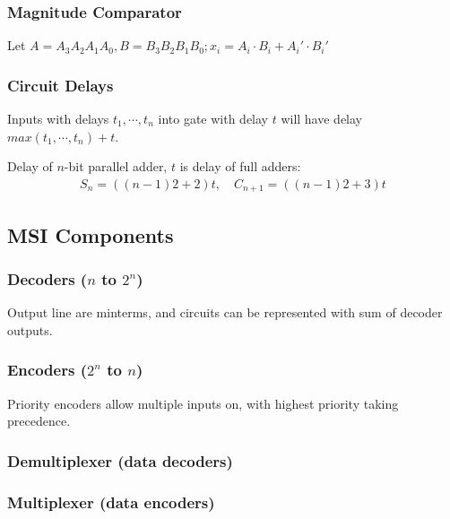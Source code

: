 \documentclass[12pt, a4paper]{article}
\begin{document}
\begin{multicols*}{3}
\subsubsection{Magnitude Comparator}
Let $A = A_3A_2A_1A_0,  B = B_3B_2B_1B_0; x_i = A_i\cdot B_i + A_i'\cdot B_i'$
{\centering{}\par}
\vspace{-3em}
\colbreak
\subsubsection{Circuit Delays}
Inputs with delays $t_1, \cdots, t_n$ into gate with delay $t$ will have delay $max(t_1, \cdots, t_n)+t$.

Delay of $n$-bit parallel adder, $t$ is delay of full adders:
\begin{align*}
  S_n = ((n-1)2 + 2)t,\quad C_{n+1} = ((n-1)2 + 3)t
\end{align*}
\subsection{MSI Components}
\subsubsection{Decoders ($n$ to $2^n$)}
Output line are minterms, and circuits can be represented with sum of decoder outputs.\\
{\centering{}\par}
\vspace{-1em}
\subsubsection{Encoders ($2^n$ to $n$)}
Priority encoders allow multiple inputs on, with highest priority taking precedence.\\
{\centering{}\par}
\vspace{-1em}
\subsubsection{Demultiplexer (data decoders)}
{\centering{}\par}
\vspace{-1em}
\subsubsection{Multiplexer (data encoders)}
{\centering{}\par}
\vspace{-1em}
\colbreak

\end{multicols*}
\end{document}
